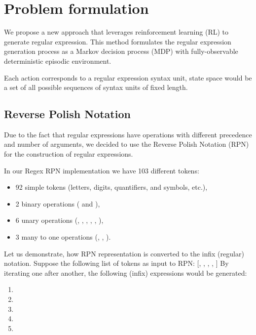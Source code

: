 \documentclass{article}
\begin{document}
\section{Problem formulation}

We propose a new approach that leverages reinforcement learning (RL) to generate regular expression.
This method formulates the regular expression generation process as a Markov decision process (MDP)
with fully-observable deterministic episodic environment.

Each action corresponds to a regular expression syntax unit, state space would be a set of all possible sequences
of syntax units of fixed length.

\subsection{Reverse Polish Notation}
Due to the fact that regular expressions have operations with different precedence and number of arguments,
we decided to use the Reverse Polish Notation (RPN) for the construction of regular expressions.

In our Regex RPN implementation we have 103 different tokens:
\begin{itemize}
  \item 92 simple tokens (letters, digits, quantifiers, and symbols, etc.),
  \item 2 binary operations ( and \codeword{|}),
  \item 6 unary operations (\codeword{*}, \codeword{+}, , , , ),
  \item 3 many to one operations (\codeword{[]}, \codeword{^[]}, ).
\end{itemize}

Let us demonstrate, how RPN representation is converted to the infix (regular) notation. Suppose the following list of tokens as input to RPN: [, , , \codeword{[]}, \codeword{*}]
By iterating one after another, the following (infix) expressions would be generated:

\begin{enumerate}
  \item {}
  \item {}
  \item {}
  \item \codeword{[ba1]}
  \item \codeword{[ba1]*}
\end{enumerate}
\end{document}
